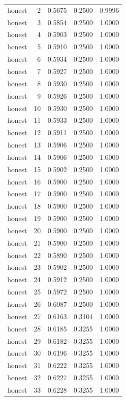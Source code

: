 \begin{tabular}{lrrrr}
honest & 2 & 0.5675 & 0.2500 & 0.9996 \\
honest & 3 & 0.5854 & 0.2500 & 1.0000 \\
honest & 4 & 0.5903 & 0.2500 & 1.0000 \\
honest & 5 & 0.5910 & 0.2500 & 1.0000 \\
honest & 6 & 0.5934 & 0.2500 & 1.0000 \\
honest & 7 & 0.5927 & 0.2500 & 1.0000 \\
honest & 8 & 0.5930 & 0.2500 & 1.0000 \\
honest & 9 & 0.5926 & 0.2500 & 1.0000 \\
honest & 10 & 0.5930 & 0.2500 & 1.0000 \\
honest & 11 & 0.5933 & 0.2500 & 1.0000 \\
honest & 12 & 0.5911 & 0.2500 & 1.0000 \\
honest & 13 & 0.5906 & 0.2500 & 1.0000 \\
honest & 14 & 0.5906 & 0.2500 & 1.0000 \\
honest & 15 & 0.5902 & 0.2500 & 1.0000 \\
honest & 16 & 0.5900 & 0.2500 & 1.0000 \\
honest & 17 & 0.5900 & 0.2500 & 1.0000 \\
honest & 18 & 0.5900 & 0.2500 & 1.0000 \\
honest & 19 & 0.5900 & 0.2500 & 1.0000 \\
honest & 20 & 0.5900 & 0.2500 & 1.0000 \\
honest & 21 & 0.5900 & 0.2500 & 1.0000 \\
honest & 22 & 0.5890 & 0.2500 & 1.0000 \\
honest & 23 & 0.5902 & 0.2500 & 1.0000 \\
honest & 24 & 0.5912 & 0.2500 & 1.0000 \\
honest & 25 & 0.5972 & 0.2500 & 1.0000 \\
honest & 26 & 0.6087 & 0.2500 & 1.0000 \\
honest & 27 & 0.6163 & 0.3104 & 1.0000 \\
honest & 28 & 0.6185 & 0.3255 & 1.0000 \\
honest & 29 & 0.6182 & 0.3255 & 1.0000 \\
honest & 30 & 0.6196 & 0.3255 & 1.0000 \\
honest & 31 & 0.6222 & 0.3255 & 1.0000 \\
honest & 32 & 0.6227 & 0.3255 & 1.0000 \\
honest & 33 & 0.6228 & 0.3255 & 1.0000 \\

\end{tabular}
